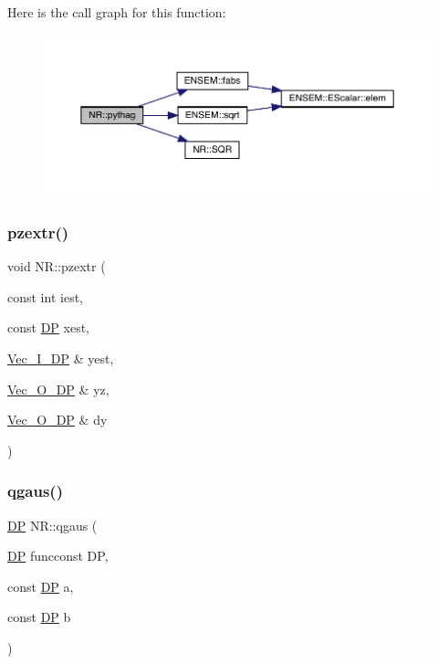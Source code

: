 Here is the call graph for this function\+:
\nopagebreak
\begin{figure}[H]
\begin{center}
\leavevmode
\includegraphics[width=350pt]{da/d46/namespaceNR_a4794ff6d4eaeeedd85a91698287cd7ac_cgraph}
\end{center}
\end{figure}
\mbox{\label{namespaceNR_a583932239d9c539ae7d372295b01101a}} 
\subsubsection{\texorpdfstring{pzextr()}{pzextr()}}
{\footnotesize\ttfamily void N\+R\+::pzextr (\begin{DoxyParamCaption}\item[{const int}]{iest,  }\item[{const \mbox{\hyperlink{namespaceNR_af6ff762dd605ff477b8e52387253a02a}{DP}}}]{xest,  }\item[{\mbox{\hyperlink{namespaceNR_a9f943da53862537c552e2a770cb170ae}{Vec\+\_\+\+I\+\_\+\+DP}} \&}]{yest,  }\item[{\mbox{\hyperlink{namespaceNR_a970094d23441f8ef6a45282a7eb2103d}{Vec\+\_\+\+O\+\_\+\+DP}} \&}]{yz,  }\item[{\mbox{\hyperlink{namespaceNR_a970094d23441f8ef6a45282a7eb2103d}{Vec\+\_\+\+O\+\_\+\+DP}} \&}]{dy }\end{DoxyParamCaption})}

\mbox{\label{namespaceNR_aea2857e7dfc20dc9c53694f04e7742c6}} 
\subsubsection{\texorpdfstring{qgaus()}{qgaus()}}
{\footnotesize\ttfamily \mbox{\hyperlink{namespaceNR_af6ff762dd605ff477b8e52387253a02a}{DP}} N\+R\+::qgaus (\begin{DoxyParamCaption}\item[{\mbox{\hyperlink{namespaceNR_af6ff762dd605ff477b8e52387253a02a}{DP}} }]{funcconst DP,  }\item[{const \mbox{\hyperlink{namespaceNR_af6ff762dd605ff477b8e52387253a02a}{DP}}}]{a,  }\item[{const \mbox{\hyperlink{namespaceNR_af6ff762dd605ff477b8e52387253a02a}{DP}}}]{b }\end{DoxyParamCaption})}

